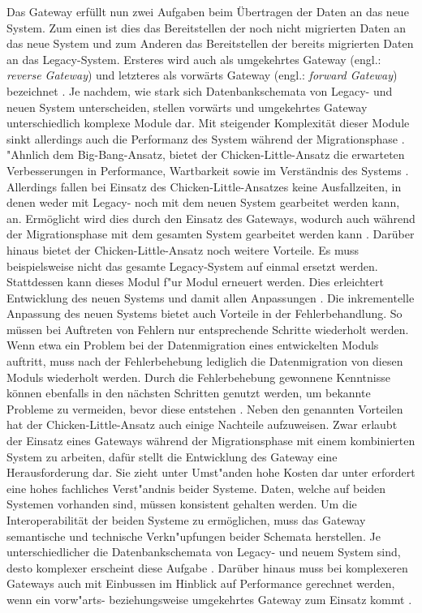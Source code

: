 \lb
Das Gateway erfüllt nun zwei Aufgaben beim Übertragen der Daten an das neue System. Zum einen ist dies das Bereitstellen der noch nicht migrierten Daten an das neue System und zum Anderen das Bereitstellen der bereits migrierten Daten an das Legacy-System. Ersteres wird auch als umgekehrtes Gateway (engl.: \textit{reverse Gateway}) und letzteres als vorwärts Gateway (engl.: \textit{forward Gateway}) bezeichnet \citep[S.~2]{wuLawless-1997}. Je nachdem, wie stark sich Datenbankschemata von Legacy- und neuen System unterscheiden, stellen vorwärts und umgekehrtes Gateway unterschiedlich komplexe Module dar. Mit steigender Komplexität dieser Module sinkt allerdings auch die Performanz des System während der Migrationsphase \citep[S.~109]{bisbal-1999}.
\lb
"Ahnlich dem Big-Bang-Ansatz, bietet der Chicken-Little-Ansatz die erwarteten Verbesserungen in Performance, Wartbarkeit sowie im Verständnis des Systems \citep[S.~108]{bisbal-1999}. Allerdings fallen bei Einsatz des Chicken-Little-Ansatzes keine Ausfallzeiten, in denen weder mit Legacy- noch mit dem neuen System gearbeitet werden kann, an. Ermöglicht wird dies durch den Einsatz des Gateways, wodurch auch während der Migrationsphase mit dem gesamten System gearbeitet werden kann \citep[S.~2]{wuLawless-1997}. Darüber hinaus bietet der Chicken-Little-Ansatz noch weitere Vorteile. Es muss beispielsweise nicht das gesamte Legacy-System auf einmal ersetzt werden. Stattdessen kann dieses Modul f"ur Modul erneuert werden. Dies erleichtert Entwicklung des neuen Systems und damit allen Anpassungen \citep[S.~3]{brodie-1993}. Die inkrementelle Anpassung des neuen Systems bietet  auch Vorteile in der Fehlerbehandlung. So müssen bei Auftreten von Fehlern nur  entsprechende Schritte wiederholt werden. Wenn etwa ein Problem bei der Datenmigration eines entwickelten Moduls auftritt, muss nach der Fehlerbehebung lediglich die Datenmigration von diesen Moduls wiederholt werden. Durch die Fehlerbehebung gewonnene Kenntnisse können ebenfalls in den nächsten Schritten genutzt werden, um bekannte Probleme zu vermeiden, bevor diese entstehen \citep[S.~3]{brodie-1993} .
\lb
Neben den genannten Vorteilen hat der Chicken-Little-Ansatz auch einige Nachteile aufzuweisen. Zwar erlaubt der Einsatz eines Gateways während der Migrationsphase mit einem kombinierten System zu arbeiten, dafür stellt die Entwicklung des Gateway eine Herausforderung dar. Sie zieht unter Umst"anden hohe Kosten dar unter erfordert eine hohes fachliches Verst"andnis beider Systeme. Daten, welche auf beiden Systemen vorhanden sind, müssen konsistent gehalten werden. Um die Interoperabilität der beiden Systeme zu ermöglichen, muss das Gateway semantische und technische Verkn"upfungen beider Schemata herstellen. Je unterschiedlicher die Datenbankschemata von Legacy- und neuem System sind, desto komplexer erscheint diese Aufgabe \citep[S.~2f]{wuLawless-1997}. Darüber hinaus muss bei komplexeren Gateways auch mit Einbussen im Hinblick auf Performance gerechnet werden, wenn ein vorw"arts- beziehungsweise umgekehrtes Gateway zum Einsatz kommt \citep[S.~109]{bisbal-1999}.
